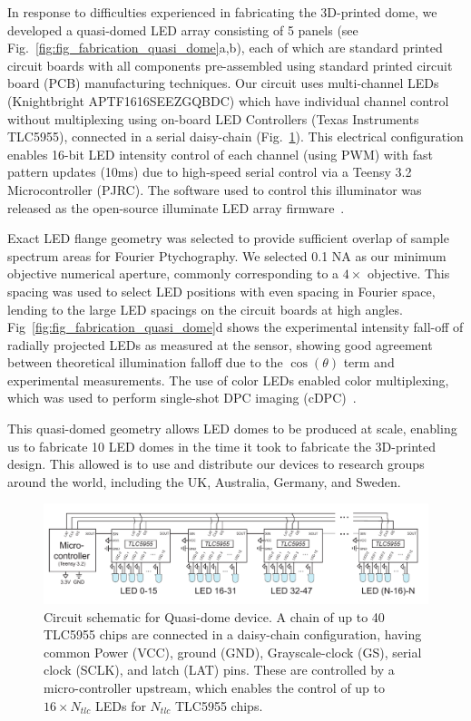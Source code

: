 In response to difficulties experienced in fabricating the 3D-printed dome, we developed a quasi-domed LED array consisting of 5 panels (see Fig.~\ref{fig:fig_fabrication_quasi_dome}a,b), each of which are standard printed circuit boards with all components pre-assembled using standard printed circuit board (PCB) manufacturing techniques. Our circuit uses multi-channel LEDs (Knightbright APTF1616SEEZGQBDC) which have individual channel control without multiplexing using on-board LED Controllers (Texas Instruments TLC5955), connected in a serial daisy-chain (Fig.~\ref{fig:fabrication_dome_circuit}). This electrical configuration enables 16-bit LED intensity control of each channel (using PWM) with fast pattern updates (10ms) due to high-speed serial control via a Teensy 3.2 Microcontroller (PJRC). The software used to control this illuminator was released as the open-source illuminate LED array firmware~\cite{illuminate}.

Exact LED flange geometry was selected to provide sufficient overlap of sample spectrum areas for Fourier Ptychography. We selected 0.1 NA as our minimum objective numerical aperture, commonly corresponding to a $4\times$ objective. This spacing was used to select LED positions with even spacing in Fourier space, lending to the large LED spacings on the circuit boards at high angles. Fig~\ref{fig:fig_fabrication_quasi_dome}d shows the experimental intensity fall-off of radially projected LEDs as measured at the sensor, showing good agreement between theoretical illumination falloff due to the $\cos(\theta)$ term and experimental measurements. The use of color LEDs enabled color multiplexing, which was used to perform single-shot DPC imaging (cDPC)~\cite{PhillipsChen17cDPC}.

This quasi-domed geometry allows LED domes to be produced at scale, enabling us to fabricate 10 LED domes in the time it took to fabricate the 3D-printed design. This allowed is to use and distribute our devices to research groups around the world, including the UK, Australia, Germany, and Sweden.

\begin{figure}
    \centering
    \includegraphics[width=\textwidth]{figures/fig_fabrication_slow_circuit.pdf}
    \caption{Circuit schematic for Quasi-dome device. A chain of up to 40 TLC5955 chips are connected in a daisy-chain configuration, having common Power (VCC), ground (GND), Grayscale-clock (GS), serial clock (SCLK), and latch (LAT) pins. These are controlled by a micro-controller upstream, which enables the control of up to $16 \times N_{tlc}$ LEDs for $N_{tlc}$ TLC5955 chips.}\label{fig:fabrication_dome_circuit}
\end{figure}

